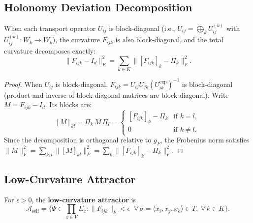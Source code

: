 \subsection{Holonomy Deviation Decomposition}
\label{sec:decomposition}

\begin{lemma}
\label{lem:decomposition}
When each transport operator $U_{ij}$ is block-diagonal (i.e., $U_{ij} = \bigoplus_k
U_{ij}^{(k)}$ with $U_{ij}^{(k)} : W_k \to W_k$), the curvature $F_{ijk}$ is also
block-diagonal, and the total curvature decomposes exactly:
\[
    \|F_{ijk} - I_d\|_F^2 = \sum_{k \in K} \big\|[F_{ijk}]_k - \Pi_k\big\|_F^2.
\]
\end{lemma}

\begin{proof}
When $U_{ij}$ is block-diagonal, $F_{ijk} = U_{ij} U_{jk} (U_{ik}^{\exp})^{-1}$ is
block-diagonal (product and inverse of block-diagonal matrices are block-diagonal).
Write $M = F_{ijk} - I_d$. Its blocks are:
\[
    [M]_{kl} = \Pi_k\, M\, \Pi_l =
    \begin{cases}
        [F_{ijk}]_k - \Pi_k & \text{if } k = l, \\
        0 & \text{if } k \neq l.
    \end{cases}
\]
Since the decomposition is orthogonal relative to $g_F$, the Frobenius norm satisfies
$\|M\|_F^2 = \sum_{k,l} \|[M]_{kl}\|_F^2 = \sum_k \|[F_{ijk}]_k - \Pi_k\|_F^2$.
\end{proof}

\subsection{Low-Curvature Attractor}
\label{sec:attractor}

\begin{definition}
\label{def:attractor}
For $\epsilon > 0$, the \textbf{low-curvature attractor} is
\[
    \mathcal{A}_{\mathrm{self}}
    = \big\{\Psi \in \prod_{x \in V} E_x : \|F_{ijk}\|_k < \epsilon
    \;\;\forall\, \sigma = \langle x_i, x_j, x_k \rangle \in T,\;
    \forall\, k \in K\big\}.
\]
\end{definition}

